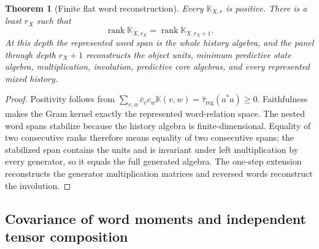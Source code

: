 \documentclass[11pt]{article}
\newtheorem{theorem}{Theorem}[section]
\numberwithin{equation}{section}
\theoremstyle{definition}
\theoremstyle{remark}
\newcommand{\rank}{\operatorname{rank}}
\begin{document}
\begin{theorem}[Finite flat word reconstruction]
\label{thm:supp-word-flatness}
Every $\mathbb K_{X,r}$ is positive.  There is a least $r_X$ such that
\begin{equation}
 \rank\mathbb K_{X,r_X}=\rank\mathbb K_{X,r_X+1}.
 \label{eq:supp-flat-stop}
\end{equation}
At this depth the represented word span is the whole history algebra, and the
panel through depth $r_X+1$ reconstructs the object units, minimum predictive
state algebra, multiplication, involution, predictive core algebras, and every
represented mixed history.
\end{theorem}

\begin{proof}
Positivity follows from
$\sum_{v,w}\bar c_vc_w\mathbb K(v,w)
=\widehat\tau_{\mathrm{reg}}(a^*a)\ge0$.  Faithfulness makes the Gram kernel
exactly the represented word-relation space.  The nested word spans stabilize
because the history algebra is finite-dimensional.  Equality of two
consecutive ranks therefore means equality of two consecutive spans; the
stabilized span contains the units and is invariant under left multiplication
by every generator, so it equals the full generated algebra.  The one-step
extension reconstructs the generator multiplication matrices and reversed
words reconstruct the involution.
\end{proof}

\subsection{Covariance of word moments and independent tensor composition}
\end{document}
